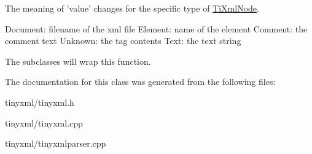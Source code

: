\-The meaning of 'value' changes for the specific type of \hyperlink{class_ti_xml_node}{\-Ti\-Xml\-Node}. \begin{DoxyVerb}
		Document:	filename of the xml file
		Element:	name of the element
		Comment:	the comment text
		Unknown:	the tag contents
		Text:		the text string
		\end{DoxyVerb}


\-The subclasses will wrap this function. 

\-The documentation for this class was generated from the following files\-:\begin{DoxyCompactItemize}
\item 
tinyxml/tinyxml.\-h\item 
tinyxml/tinyxml.\-cpp\item 
tinyxml/tinyxmlparser.\-cpp\end{DoxyCompactItemize}
